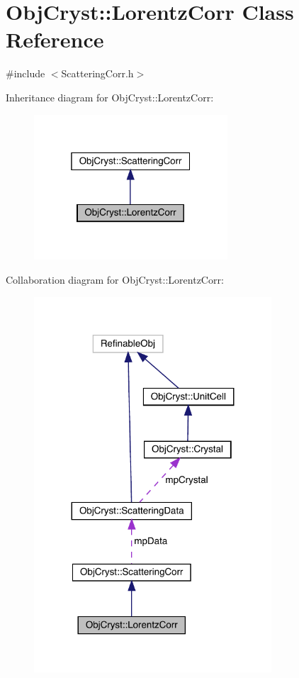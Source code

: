 \hypertarget{class_obj_cryst_1_1_lorentz_corr}{}\section{Obj\+Cryst\+::Lorentz\+Corr Class Reference}
\label{class_obj_cryst_1_1_lorentz_corr}


{\ttfamily \#include $<$Scattering\+Corr.\+h$>$}



Inheritance diagram for Obj\+Cryst\+::Lorentz\+Corr\+:
\nopagebreak
\begin{figure}[H]
\begin{center}
\leavevmode
\includegraphics[width=205pt]{class_obj_cryst_1_1_lorentz_corr__inherit__graph}
\end{center}
\end{figure}


Collaboration diagram for Obj\+Cryst\+::Lorentz\+Corr\+:
\nopagebreak
\begin{figure}[H]
\begin{center}
\leavevmode
\includegraphics[width=251pt]{class_obj_cryst_1_1_lorentz_corr__coll__graph}
\end{center}
\end{figure}
